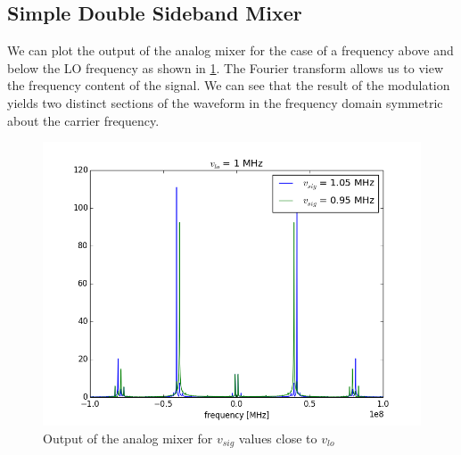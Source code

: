 \documentclass{article}
\begin{document}
  
  
 
 
 
 
%  

  \subsection{Simple Double Sideband Mixer}
  We can plot the output of the analog mixer for the case of a frequency above and below the LO frequency as shown in \ref{fig:analog_dsb}.  The Fourier transform allows us to view the frequency content of the signal. We can see that the result of the modulation yields two distinct sections of the waveform in the frequency domain symmetric about the carrier frequency.
  
\begin{figure}[h!]
\centering
\includegraphics[scale=0.7]{analog_mix.png}
\caption{Output of the analog mixer for $v_{sig}$ values close to $v_{lo}$}
\label{fig:analog_dsb}
\end{figure}
\end{document}

